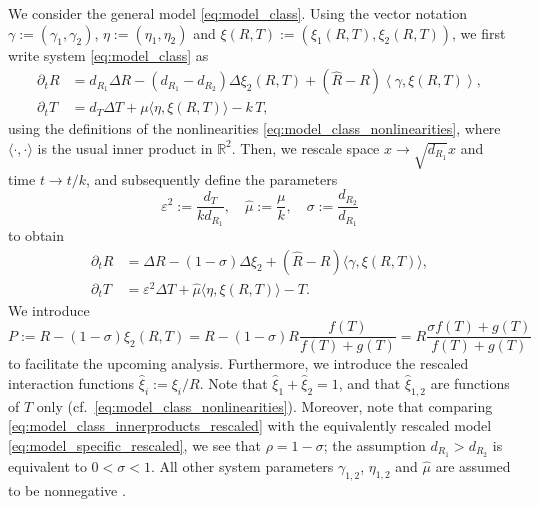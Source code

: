 \documentclass[a4paper,10pt,abstract=true,parskip=true]{scrartcl}
\theoremstyle{remark}
\numberwithin{equation}{section}
\numberwithin{thm}{section}
\newcommand{\eps}{\varepsilon}
\begin{document}
We consider the general model \eqref{eq:model_class}. Using the vector notation $\gamma := (\gamma_1,\gamma_2)$, $\eta := (\eta_1,\eta_2)$ and $\xi(R,T) := \left(\xi_1(R,T),\xi_2(R,T)\right)$, we first write system \eqref{eq:model_class} as
\begin{subequations}\label{eq:model_class_innerproducts}
    \begin{align}
    \partial_t R &= d_{R_1}\Delta R - (d_{R_1}-d_{R_2}) \Delta \xi_2(R,T) + (\hat{R}-R)\left\langle \gamma, \xi(R,T) \right\rangle,\\
    \partial_t T &= d_T \Delta T + \mu \langle \eta,\xi(R,T) \rangle - k\,T,
    \end{align}
\end{subequations}
using the definitions of the nonlinearities \eqref{eq:model_class_nonlinearities}, where $\langle \cdot,\cdot \rangle$ is the usual inner product in $\mathbb{R}^2$. Then, we rescale space $x \to \sqrt{d_{R_1}} x$ and time $t \to t/k$, and subsequently define the parameters
\begin{equation}
    \eps^2 := \frac{d_T}{k d_{R_1}} , \quad \hat{\mu} := \frac{\mu}{k}, \quad \sigma := \frac{d_{R_2}}{d_{R_1}}
\end{equation}
to obtain
\begin{subequations}\label{eq:model_class_innerproducts_rescaled}
    \begin{align}
    \partial_t R &= \Delta R - (1-\sigma) \Delta \xi_2 + (\hat{R}-R)\langle \gamma, \xi(R,T) \rangle,\\
    \partial_t T &= \eps^2 \Delta T + \hat{\mu} \langle \eta,\xi(R,T) \rangle - T.
    \end{align}
\end{subequations}
We introduce
\begin{equation}\label{eq:model_class_def_P}
    P := R - (1-\sigma) \xi_2(R,T) = R - (1-\sigma) R \frac{f(T)}{f(T)+g(T)} = R \frac{\sigma f(T)+ g(T)}{f(T)+g(T)}
\end{equation}
to facilitate the upcoming analysis. Furthermore, we introduce the rescaled interaction functions $\hat{\xi}_i := \xi_i/R$. Note that $\hat{\xi}_1 + \hat{\xi}_2 = 1$, and that $\hat{\xi}_{1,2}$ are functions of $T$ only (cf.~\eqref{eq:model_class_nonlinearities}). Moreover, note that comparing \eqref{eq:model_class_innerproducts_rescaled} with the equivalently rescaled model \eqref{eq:model_specific_rescaled}, we see that $\rho = 1-\sigma$; the assumption $d_{R_1} > d_{R_2}$ is equivalent to $0<\sigma<1$. All other system parameters $\gamma_{1,2}$, $\eta_{1,2}$ and $\hat{\mu}$ are assumed to be nonnegative \cite{Morgan_etal.2025}.\\
\end{document}
